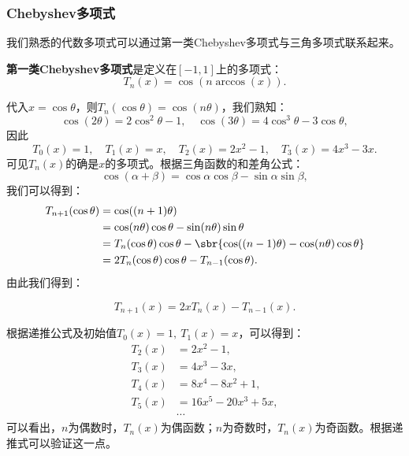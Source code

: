 \subsubsection{Chebyshev多项式}

我们熟悉的代数多项式可以通过第一类Chebyshev多项式与三角多项式联系起来。

\begin{definition}[第一类Chebyshev多项式]
    \label{def:chebychev_polynomial}
    \textbf{第一类Chebyshev多项式}是定义在$[-1,1]$上的多项式：
    \begin{equation}
        T_n(x)=\cos(n\arccos(x)).
    \end{equation}
\end{definition}

代入$x=\cos\theta$，则$T_n(\cos\theta)=\cos(n\theta)$，我们熟知：
\begin{equation}
    \cos(2\theta)=2\cos^2\theta-1,\quad \cos(3\theta)=4\cos^3\theta-3\cos\theta,
\end{equation}
因此
\begin{equation}
    T_0(x)=1,\quad T_1(x)=x,\quad T_2(x)=2x^2-1,\quad T_3(x)=4x^3-3x.
\end{equation}
可见$T_n(x)$的确是$x$的多项式。根据三角函数的和差角公式：
\begin{equation}
    \cos(\alpha+\beta)=\cos\alpha\cos\beta-\sin\alpha\sin\beta,
\end{equation}
我们可以得到：
\begin{align}
    T_{n+1}(\cos\theta)&=\cos((n+1)\theta)\nonumber\\
    &=\cos(n\theta)\cos\theta-\sin(n\theta)\sin\theta\nonumber\\
    &=T_n(\cos\theta)\cos\theta-\sbr{\cos((n-1)\theta)-\cos(n\theta)\cos\theta}\nonumber\\
    &=2T_n(\cos\theta)\cos\theta-T_{n-1}(\cos\theta).
\end{align}
由此我们得到：
\begin{theorem}[第一类Chebyshev多项式的递推公式]
    \begin{equation}
        T_{n+1}(x)=2xT_n(x)-T_{n-1}(x).
    \end{equation}
\end{theorem}

根据递推公式及初始值$T_0(x)=1,\ T_1(x)=x$，可以得到：
\begin{equation}
    \begin{aligned}
        T_2(x)&=2x^2-1,\\
        T_3(x)&=4x^3-3x,\\
        T_4(x)&=8x^4-8x^2+1,\\
        T_5(x)&=16x^5-20x^3+5x,\\
        &\cdots
    \end{aligned}
\end{equation}
可以看出，$n$为偶数时，$T_n(x)$为偶函数；$n$为奇数时，$T_n(x)$为奇函数。根据递推式可以验证这一点。

